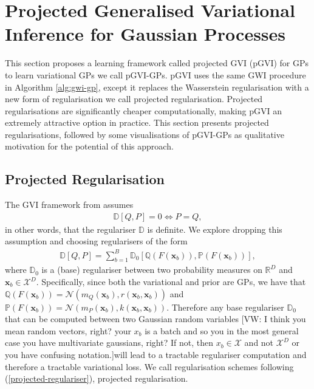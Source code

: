 \documentclass{article}
\newcommand{\vw}[1]{{\color{green} [VW: #1]}}
\newcommand{\calX}{\mathcal{X}}
\numberwithin{equation}{section}
\begin{document}
\newpage
\section{Projected Generalised Variational Inference for Gaussian Processes}
This section proposes a learning framework called projected GVI (pGVI) for GPs to learn variational GPs we call pGVI-GPs.
pGVI uses the same GWI procedure in Algorithm \ref{alg:gwi-gp}, except it replaces the Wasserstein regularisation with a new form of regularisation we call projected regularisation.
Projected regularisations are significantly cheaper computationally, making pGVI an extremely attractive option in practice.
This section presents projected regularisations, followed by some visualisations of pGVI-GPs as qualitative motivation for the potential of this approach.

\subsection{Projected Regularisation}
The GVI framework from \cite{knoblauch2022optimization} assumes
\begin{align}
    \mathbb{D}\left[Q, P\right] = 0 \Leftrightarrow P = Q,
\end{align}
in other words, that the regulariser $\mathbb{D}$ is definite.
We explore dropping this assumption and choosing regularisers of the form
\begin{align}
    \mathbb{D}\left[Q, P\right] = \sum_{{b}=1}^{B} \mathbb{D}_0 \left[\mathbb{Q}\left(F(\mathbf{x}_{b})\right), \mathbb{P}\left(F(\mathbf{x}_{b})\right)\right],
    \label{projected-regulariser}
\end{align}
where $\mathbb{D}_0$ is a (base) regulariser between two probability measures on $\mathbb{R}^D$ and $\mathbf{x}_{b} \in \mathcal{X}^D$.
Specifically, since both the variational and prior are GPs, we have that $\mathbb{Q}\left(F(\mathbf{x}_{b})\right) = \mathcal{N}\left(m_Q(\mathbf{x}_{b}), r(\mathbf{x}_{b}, \mathbf{x}_{b})\right)$ and $\mathbb{P}\left(F(\mathbf{x}_{b})\right) = \mathcal{N}\left(m_P(\mathbf{x}_{b}), k(\mathbf{x}_{b}, \mathbf{x}_{b})\right)$.
Therefore any base regulariser $\mathbb{D}_0$ that can be computed between two Gaussian random variables \vw{I think you mean random vectors, right? your $x_b$ is a batch and so you in the most general case you have multivariate gaussians, right? If not, then $x_b \in \calX$ and not $\calX^D$ or you have confusing notation.}will lead to a tractable regulariser computation and therefore a tractable variational loss. We call regularisation schemes following (\ref{projected-regulariser}), projected regularisation.
\end{document}
